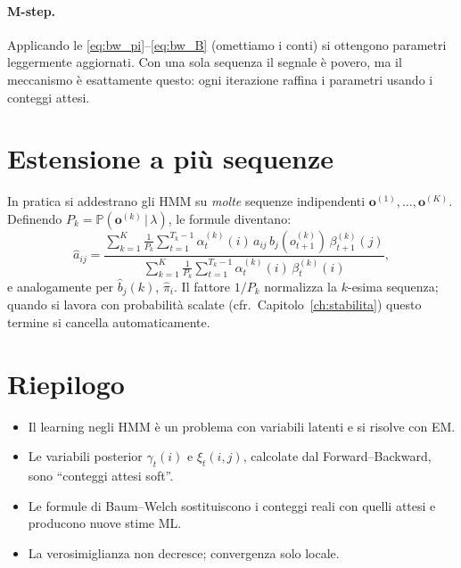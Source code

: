 \documentclass[11pt,a4paper,oneside]{book}
\theoremstyle{plain}
\theoremstyle{definition}
\theoremstyle{remark}
\newcommand{\Prob}{\mathbb{P}}
\newcommand{\hmm}{\lambda}                   %
\newcommand{\Tlen}{T}                        %
\newcommand{\seqobs}{\mathbf{o}}             %
\newcommand{\fwd}{\alpha}                    %
\newcommand{\bwd}{\beta}                     %
\newcommand{\gam}{\gamma}                    %
\newcommand{\xig}{\xi}                       %
\newcommand{\given}{\,\vert\,}
\begin{document}
\paragraph{M-step.} Applicando le \eqref{eq:bw_pi}--\eqref{eq:bw_B}
(omettiamo i conti) si ottengono parametri leggermente aggiornati.
Con una sola sequenza il segnale è povero, ma il meccanismo è esattamente
questo: ogni iterazione raffina i parametri usando i conteggi attesi.

\section{Estensione a più sequenze}

In pratica si addestrano gli HMM su \emph{molte} sequenze
indipendenti $\seqobs^{(1)},\dots,\seqobs^{(K)}$. Definendo
$P_k = \Prob(\seqobs^{(k)}\given\hmm)$, le formule diventano:
\begin{equation}
\hat a_{ij} = \frac{\sum_{k=1}^{K}\frac{1}{P_k}\sum_{t=1}^{\Tlen_k-1}
                   \fwd_t^{(k)}(i)\,a_{ij}\,b_j(o_{t+1}^{(k)})\,\bwd_{t+1}^{(k)}(j)}
                  {\sum_{k=1}^{K}\frac{1}{P_k}\sum_{t=1}^{\Tlen_k-1}
                   \fwd_t^{(k)}(i)\,\bwd_t^{(k)}(i)},
\end{equation}
e analogamente per $\hat b_j(k)$, $\hat\pi_i$. Il fattore $1/P_k$
normalizza la $k$-esima sequenza; quando si lavora con probabilità
scalate (cfr.\ Capitolo~\ref{ch:stabilita}) questo termine si cancella
automaticamente.

\section{Riepilogo}

\begin{itemize}[leftmargin=*]
    \item Il learning negli HMM è un problema con variabili latenti
          e si risolve con EM.
    \item Le variabili posterior $\gam_t(i)$ e $\xig_t(i,j)$, calcolate
          dal Forward--Backward, sono ``conteggi attesi soft''.
    \item Le formule di Baum--Welch sostituiscono i conteggi reali
          con quelli attesi e producono nuove stime ML.
    \item La verosimiglianza non decresce; convergenza solo locale.
\end{itemize}
\end{document}
